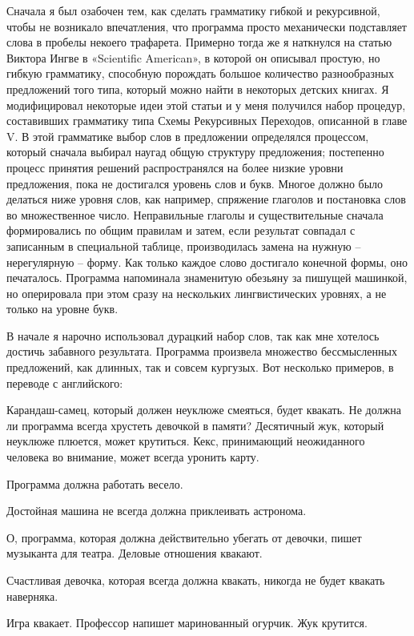 \documentclass[../main.tex]{subfiles}
\begin{document}
Сначала я был озабочен тем, как сделать грамматику гибкой и рекурсивной, чтобы не возникало впечатления, что программа просто механически подставляет слова в пробелы некоего трафарета. Примерно тогда же я наткнулся на статью Виктора Ингве в «Scientific American», в которой он описывал простую, но гибкую грамматику, способную порождать большое количество разнообразных предложений того типа, который можно найти в некоторых детских книгах. Я модифицировал некоторые идеи этой статьи и у меня получился набор процедур, составивших грамматику типа Схемы Рекурсивных Переходов, описанной в главе V. В этой грамматике выбор слов в предложении определялся процессом, который сначала выбирал наугад общую структуру предложения; постепенно процесс принятия решений распространялся на более низкие уровни предложения, пока не достигался уровень слов и букв. Многое должно было делаться ниже уровня слов, как например, спряжение глаголов и постановка слов во множественное число. Неправильные глаголы и существительные сначала формировались по общим правилам и затем, если результат совпадал с записанным в специальной таблице, производилась замена на нужную \--- нерегулярную \--- форму. Как только каждое слово достигало конечной формы, оно печаталось. Программа напоминала знаменитую обезьяну за пишущей машинкой, но оперировала при этом сразу на нескольких лингвистических уровнях, а не только на уровне букв.

В начале я нарочно использовал дурацкий набор слов, так как мне хотелось достичь забавного результата. Программа произвела множество бессмысленных предложений, как длинных, так и совсем кургузых. Вот несколько примеров, в переводе с английского:

Карандаш-самец, который должен неуклюже смеяться, будет квакать. Не должна ли программа всегда хрустеть девочкой в памяти? Десятичный жук, который неуклюже плюется, может крутиться. Кекс, принимающий неожиданного человека во внимание, может всегда уронить карту.

Программа должна работать весело.

Достойная машина не всегда должна приклеивать астронома.

О, программа, которая должна действительно убегать от девочки, пишет музыканта для театра. Деловые отношения квакают.

Счастливая девочка, которая всегда должна квакать, никогда не будет квакать наверняка.

Игра квакает. Профессор напишет маринованный огурчик. Жук крутится.
\end{document}
